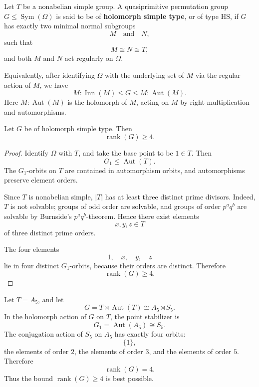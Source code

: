 \begin{definition}
    Let \(T\) be a nonabelian simple group. A quasiprimitive permutation group
    \(G \leq \operatorname{Sym}(\Omega)\) is said to be of \textbf{holomorph simple
    type}, or of type \(\mathrm{HS}\), if \(G\) has exactly two minimal normal
    subgroups
    \[
        M
        \quad\text{and}\quad
        N,
    \]
    such that
    \[
        M\cong N\cong T,
    \]
    and both \(M\) and \(N\) act regularly on \(\Omega\).
    
    Equivalently, after identifying \(\Omega\) with the underlying set of \(M\) via
    the regular action of \(M\), we have
    \[
        M:\operatorname{Inn}(M)
        \leq
        G
        \leq
        M:\operatorname{Aut}(M).
    \]
    Here \(M:\operatorname{Aut}(M)\) is the holomorph of \(M\), acting on \(M\)
    by right multiplication and automorphisms.
    \end{definition}

\begin{theorem}
Let \(G\) be of holomorph simple type. Then
\[
\operatorname{rank}(G)\geq 4.
\]
\end{theorem}

\begin{proof}
Identify \(\Omega\) with \(T\), and take the base point to be \(1\in T\). Then
\[
G_1 \leq \operatorname{Aut}(T).
\]
The \(G_1\)-orbits on \(T\) are contained in automorphism orbits, and automorphisms
preserve element orders.

Since \(T\) is nonabelian simple, \(|T|\) has at least three distinct prime divisors.
Indeed, \(T\) is not solvable; groups of odd order are solvable, and groups of order
\(p^a q^b\) are solvable by Burnside's \(p^a q^b\)-theorem. Hence there exist
elements
\[
x,y,z \in T
\]
of three distinct prime orders.

The four elements
\[
1,\quad x,\quad y,\quad z
\]
lie in four distinct \(G_1\)-orbits, because their orders are distinct. Therefore
\[
\operatorname{rank}(G)\geq 4.
\]
\end{proof}

\begin{example}
Let \(T=A_5\), and let
\[
G=T\rtimes \operatorname{Aut}(T) \cong A_5 \rtimes S_5.
\]
In the holomorph action of \(G\) on \(T\), the point stabilizer is
\[
G_1=\operatorname{Aut}(A_5)\cong S_5.
\]
The conjugation action of \(S_5\) on \(A_5\) has exactly four orbits:
\[
\{1\},
\]
the elements of order \(2\), the elements of order \(3\), and the elements of order
\(5\). Therefore
\[
\operatorname{rank}(G)=4.
\]
Thus the bound \(\operatorname{rank}(G)\geq 4\) is best possible.
\end{example}

